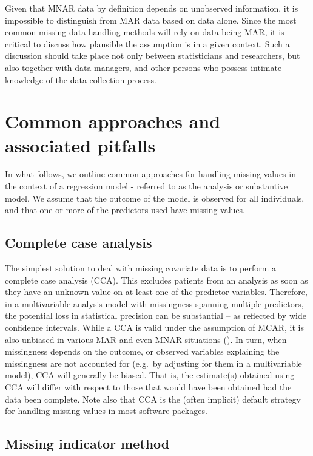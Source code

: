 \documentclass[
  letterpaper,
  DIV=11,
  numbers=noendperiod]{scrreprt}
\begin{document}
Given that MNAR data by definition depends on unobserved information, it
is impossible to distinguish from MAR data based on data alone. Since
the most common missing data handling methods will rely on data being
MAR, it is critical to discuss how plausible the assumption is in a
given context. Such a discussion should take place not only between
statisticians and researchers, but also together with data managers, and
other persons who possess intimate knowledge of the data collection
process.

\section{Common approaches and associated
pitfalls}\label{common-approaches-and-associated-pitfalls}

In what follows, we outline common approaches for handling missing
values in the context of a regression model - referred to as the
analysis or substantive model. We assume that the outcome of the model
is observed for all individuals, and that one or more of the predictors
used have missing values.

\subsection{Complete case analysis}\label{complete-case-analysis}

The simplest solution to deal with missing covariate data is to perform
a complete case analysis (CCA). This excludes patients from an analysis
as soon as they have an unknown value on at least one of the predictor
variables. Therefore, in a multivariable analysis model with missingness
spanning multiple predictors, the potential loss in statistical
precision can be substantial -- as reflected by wide confidence
intervals. While a CCA is valid under the assumption of MCAR, it is also
unbiased in various MAR and even MNAR situations
(). In turn, when missingness depends on the outcome, or observed
variables explaining the missingness are not accounted for (e.g.~by
adjusting for them in a multivariable model), CCA will generally be
biased. That is, the estimate(s) obtained using CCA will differ with
respect to those that would have been obtained had the data been
complete. Note also that CCA is the (often implicit) default strategy
for handling missing values in most software packages.

\subsection{Missing indicator method}\label{missing-indicator-method}
\end{document}
